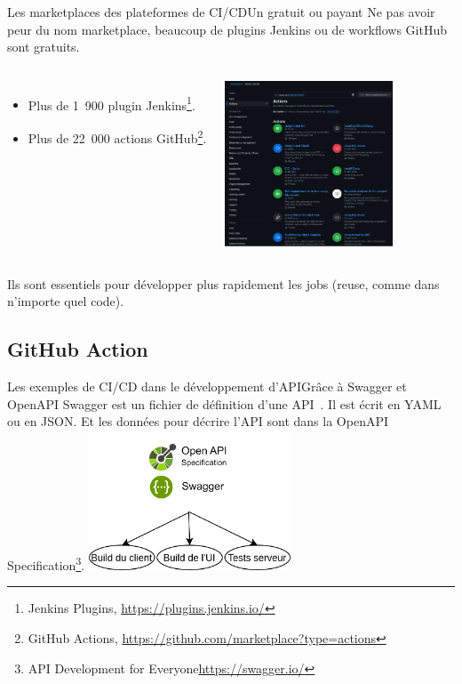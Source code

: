 \documentclass{beamer}
\begin{document}
    \begin{frame}{Les marketplaces des plateformes de CI/CD}{Un  gratuit ou payant}
        \transdissolve
        Ne pas avoir peur du nom marketplace, beaucoup de plugins Jenkins ou de workflows GitHub sont gratuits.
        \begin{columns}
            \begin{itemize}
                \item Plus de 1~900 plugin Jenkins\footnote[frame]{Jenkins Plugins, \url{https://plugins.jenkins.io/}}.
                \item Plus de 22~000 actions GitHub\footnote[frame]{GitHub Actions, \url{https://github.com/marketplace?type=actions}}.
            \end{itemize}
            \centering
            \includegraphics[width=5cm]{image/github-marketplace}
        \end{columns}
        Ils sont essentiels pour développer plus rapidement les jobs (reuse, comme dans n'importe quel code).
    \end{frame}

    \subsection{GitHub Action}\label{subsec:github-action}
    \begin{frame}{Les exemples de CI/CD dans le développement d'API}{Grâce à Swagger et OpenAPI}
        \transdissolve
        Swagger est un fichier de définition d'une API~.
        Il est écrit en YAML ou en JSON. Et les données pour décrire l'API sont dans la OpenAPI Specification\footnote{API Development for Everyone\url{https://swagger.io/}}.
        \break
        \centering
        \includegraphics[width=6cm]{image/swagger-capacity.drawio}
    \end{frame}
\end{document}
